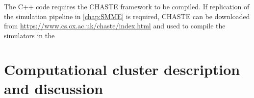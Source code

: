 The C++ code requires the CHASTE framework \cite{Mirams2013} to be compiled. If replication of the simulation pipeline in \autoref{chap:SMME} is required, CHASTE can be downloaded from \url{https://www.cs.ox.ac.uk/chaste/index.html} and used to compile the simulators in the \

\section{Computational cluster description and discussion}